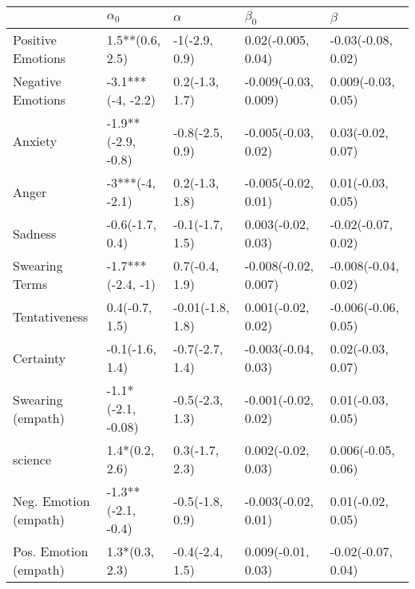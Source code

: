\begin{tabular}{lllll}
\toprule
{} &          $\alpha_0$ &          $\alpha$ &             $\beta_0$ &              $\beta$ \\
\midrule
Positive Emotions     &     1.5**(0.6, 2.5) &     -1(-2.9, 0.9) &    0.02(-0.005, 0.04) &   -0.03(-0.08, 0.02) \\
Negative Emotions     &   -3.1***(-4, -2.2) &    0.2(-1.3, 1.7) &  -0.009(-0.03, 0.009) &   0.009(-0.03, 0.05) \\
Anxiety               &  -1.9**(-2.9, -0.8) &   -0.8(-2.5, 0.9) &   -0.005(-0.03, 0.02) &    0.03(-0.02, 0.07) \\
Anger                 &     -3***(-4, -2.1) &    0.2(-1.3, 1.8) &   -0.005(-0.02, 0.01) &    0.01(-0.03, 0.05) \\
Sadness               &     -0.6(-1.7, 0.4) &   -0.1(-1.7, 1.5) &    0.003(-0.02, 0.03) &   -0.02(-0.07, 0.02) \\
Swearing Terms        &   -1.7***(-2.4, -1) &    0.7(-0.4, 1.9) &  -0.008(-0.02, 0.007) &  -0.008(-0.04, 0.02) \\
Tentativeness         &      0.4(-0.7, 1.5) &  -0.01(-1.8, 1.8) &    0.001(-0.02, 0.02) &  -0.006(-0.06, 0.05) \\
Certainty             &     -0.1(-1.6, 1.4) &   -0.7(-2.7, 1.4) &   -0.003(-0.04, 0.03) &    0.02(-0.03, 0.07) \\
Swearing (empath)     &  -1.1*(-2.1, -0.08) &   -0.5(-2.3, 1.3) &   -0.001(-0.02, 0.02) &    0.01(-0.03, 0.05) \\
science               &      1.4*(0.2, 2.6) &    0.3(-1.7, 2.3) &    0.002(-0.02, 0.03) &   0.006(-0.05, 0.06) \\
Neg. Emotion (empath) &  -1.3**(-2.1, -0.4) &   -0.5(-1.8, 0.9) &   -0.003(-0.02, 0.01) &    0.01(-0.02, 0.05) \\
Pos. Emotion (empath) &      1.3*(0.3, 2.3) &   -0.4(-2.4, 1.5) &    0.009(-0.01, 0.03) &   -0.02(-0.07, 0.04) \\
\bottomrule
\end{tabular}
